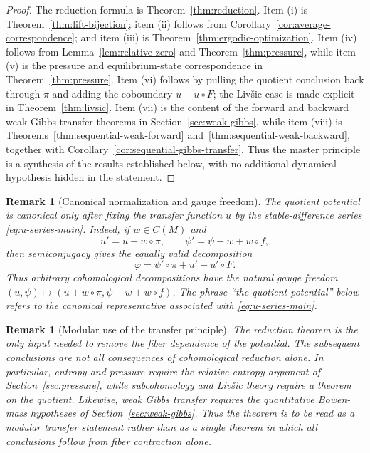 \documentclass[11pt,a4paper]{article}
\newtheorem{remark}[theorem]{Remark}
\begin{document}
\begin{proof}
The reduction formula is Theorem~\ref{thm:reduction}. Item (i) is
Theorem~\ref{thm:lift-bijection}; item (ii) follows from
Corollary~\ref{cor:average-correspondence}; and item (iii) is
Theorem~\ref{thm:ergodic-optimization}. Item (iv) follows from
Lemma~\ref{lem:relative-zero} and Theorem~\ref{thm:pressure}, while item (v)
is the pressure and equilibrium-state correspondence in
Theorem~\ref{thm:pressure}. Item (vi) follows by pulling the quotient
conclusion back through $\pi$ and adding the coboundary $u-u\circ F$;
the Liv\v{s}ic case is made explicit in Theorem~\ref{thm:livsic}. Item (vii) is the content of the forward and backward weak Gibbs transfer
theorems in Section~\ref{sec:weak-gibbs}, while item (viii) is
Theorems~\ref{thm:sequential-weak-forward} and~\ref{thm:sequential-weak-backward}, together with
Corollary~\ref{cor:sequential-gibbs-transfer}. Thus the master principle is a
synthesis of the results established below, with no additional dynamical
hypothesis hidden in the statement.
\end{proof}

\begin{remark}[Canonical normalization and gauge freedom]
\label{rem:gauge-freedom}
The quotient potential is canonical only after fixing the transfer function
$u$ by the stable-difference series \eqref{eq:u-series-main}. Indeed, if
$w\in C(M)$ and
\[
 u'=u+w\circ\pi,
 \qquad
 \psi'=\psi-w+w\circ f,
\]
then semiconjugacy gives the equally valid decomposition
\[
 \varphi=\psi'\circ\pi+u'-u'\circ F.
\]
Thus arbitrary cohomological decompositions have the natural gauge freedom
$(u,\psi)\mapsto(u+w\circ\pi,\psi-w+w\circ f)$. The phrase
``the quotient potential'' below refers to the canonical representative
associated with \eqref{eq:u-series-main}.
\end{remark}

\begin{remark}[Modular use of the transfer principle]
\label{rem:master-modular}
The reduction theorem is the only input needed to remove the fiber dependence
of the potential. The subsequent conclusions are not all consequences of
cohomological reduction alone. In particular, entropy and pressure require
the relative entropy argument of Section~\ref{sec:pressure}, while
subcohomology and Liv\v{s}ic theory require a theorem on the quotient.
Likewise, weak Gibbs transfer requires the quantitative Bowen-mass
hypotheses of Section~\ref{sec:weak-gibbs}. Thus the theorem is to be read as a modular transfer
statement rather than as a single theorem in which all conclusions follow
from fiber contraction alone.
\end{remark}
\end{document}
